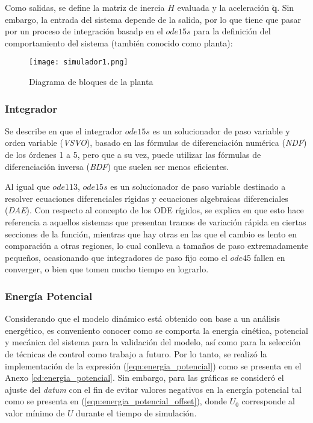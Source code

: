     Como salidas, se define la matriz de inercia $H$ evaluada y la aceleración $\boldsymbol{\ddot{q}}$. Sin embargo, la entrada del sistema depende de la salida, por lo que tiene
    que pasar por un proceso de integración basadp en el $ode15s$ para la definición del comportamiento del sistema (también conocido como planta):
    \begin{figure}[H]
        \texttt{[image: simulador1.png]}
        \centering
        \caption{Diagrama de bloques de la planta}
        \label{fig:planta}
    \end{figure}
    
    \subsubsection{Integrador}
    Se describe en \cite{ode15s} que el integrador $ode15s$ es un solucionador de paso variable y orden variable (\emph{VSVO}), basado en las fórmulas de diferenciación numérica
    (\emph{NDF}) de los órdenes 1 a 5, pero que a su vez, puede utilizar las fórmulas de diferenciación inversa (\emph{BDF}) que suelen ser menos eficientes. 
    
    Al igual que $ode113$, $ode15s$ es un solucionador de paso variable destinado a resolver ecuaciones diferenciales rígidas y ecuaciones algebraicas diferenciales (\emph{DAE}). 
    Con respecto al concepto de los ODE rígidos, se explica en \cite{ODEs} que esto hace referencia a aquellos sistemas que presentan tramos de variación rápida en ciertas secciones de
    la función, mientras que hay otras en las que el cambio es lento en comparación a otras regiones, lo cual conlleva a tamaños de paso extremadamente pequeños, ocasionando que
    integradores de paso fijo como el $ode45$ fallen en converger, o bien que tomen mucho tiempo en lograrlo.

    \subsubsection{Energía Potencial}
    Considerando que el modelo dinámico está obtenido con base a un análisis energético, es conveniento conocer como se comporta la energía cinética, potencial y mecánica del 
    sistema para la validación del modelo, así como para la selección de técnicas de control como trabajo a futuro. Por lo tanto, se realizó la implementación de la expresión
    (\ref{eqn:energia_potencial}) como se presenta en el Anexo \ref{cd:energia_potencial}. Sin embargo, para las gráficas se consideró el ajuste del \emph{datum} con el fin de
    evitar valores negativos en la energía potencial tal como se presenta en (\ref{eqn:energia_potencial_offset}), donde $U_0$ corresponde al valor mínimo de $U$ durante el
    tiempo de simulación. 

